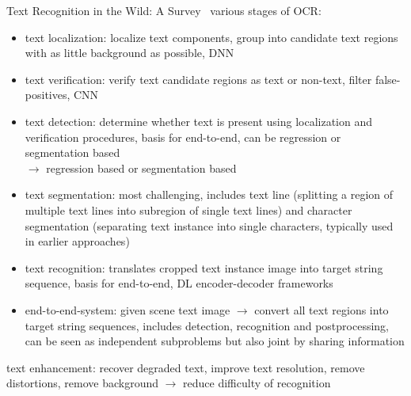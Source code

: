 Text Recognition in the Wild: A Survey~\citep{chen_text_2021}
various stages of \ac{OCR}:
\begin{itemize}
    \item text localization: localize text components, group into candidate text regions with
        as little background as possible, DNN
    \item text verification: verify text candidate regions as text or non-text,
        filter false-positives, CNN
    \item text detection: determine whether text is present using localization and verification
        procedures, basis for end-to-end, can be regression or segmentation based\\
        $\rightarrow$ regression based or segmentation based
    \item text segmentation: most challenging, includes text line (splitting a region of multiple
        text lines into subregion of single text lines) and character segmentation (separating
        text instance into single characters, typically used in earlier approaches)
    \item text recognition: translates cropped text instance image into target string sequence,
        basis for end-to-end, DL encoder-decoder frameworks
    \item end-to-end-system: given scene text image $\rightarrow$ convert all text regions into
        target string sequences, includes detection, recognition and postprocessing, can be
        seen as independent subproblems but also joint by sharing information
\end{itemize}

text enhancement: recover degraded text, improve text resolution, remove distortions,
remove background $\rightarrow$ reduce difficulty of recognition

